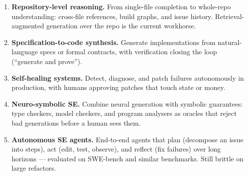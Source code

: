 \begin{center}
\end{center}

\begin{enumerate}[leftmargin=1.2em, itemsep=0.3em]
  \item \textbf{Repository-level reasoning.} From single-file completion to whole-repo understanding: cross-file references, build graphs, and issue history. Retrieval-augmented generation over the repo is the current workhorse.
  \item \textbf{Specification-to-code synthesis.} Generate implementations from natural-language specs or formal contracts, with verification closing the loop (``generate and prove'').
  \item \textbf{Self-healing systems.} Detect, diagnose, and patch failures autonomously in production, with humans approving patches that touch state or money.
  \item \textbf{Neuro-symbolic SE.} Combine neural generation with symbolic guarantees: type checkers, model checkers, and program analysers as oracles that reject bad generations before a human sees them.
  \item \textbf{Autonomous SE agents.} End-to-end agents that plan (decompose an issue into steps), act (edit, test, observe), and reflect (fix failures) over long horizons --- evaluated on SWE-bench and similar benchmarks. Still brittle on large refactors.
\end{enumerate}

